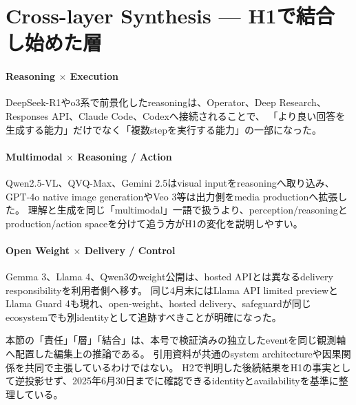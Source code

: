\Needspace{0.36\textheight}
\section{Cross-layer Synthesis — H1で結合し始めた層}
\label{analysis:h1-cross-layer}

\paragraph{Reasoning $\times$ Execution}
DeepSeek-R1やo3系で前景化したreasoningは、Operator、Deep Research、Responses API、Claude Code、Codexへ接続されることで、
「より良い回答を生成する能力」だけでなく「複数stepを実行する能力」の一部になった。
\cite{src-8f8555b73e1b,src-bf92f3d905c3,src-95b210494c88,src-8fec3ef3a97d,src-78593f4b387f,src-e7aef8f1b13b}

\paragraph{Multimodal $\times$ Reasoning / Action}
Qwen2.5-VL、QVQ-Max、Gemini 2.5はvisual inputをreasoningへ取り込み、GPT-4o native image generationやVeo 3等は出力側をmedia productionへ拡張した。
理解と生成を同じ「multimodal」一語で扱うより、perception/reasoningとproduction/action spaceを分けて追う方がH1の変化を説明しやすい。
\cite{src-dc21f366b638,src-8cb736b33646,src-421ee9af3f80,src-877e7da88408,src-e68f8ce96685}

\paragraph{Open Weight $\times$ Delivery / Control}
Gemma 3、Llama 4、Qwen3のweight公開は、hosted APIとは異なるdelivery responsibilityを利用者側へ移す。
同じ4月末にはLlama API limited previewとLlama Guard 4も現れ、open-weight、hosted delivery、safeguardが同じecosystemでも別identityとして追跡すべきことが明確になった。
\cite{src-1bb16d7254b1,src-05f285e9757b,src-3e4a3f3b3d83,src-fca961b24baf,src-383476bdf62e}

\begin{claimboundary}[横断分析の境界]
本節の「責任」「層」「結合」は、本号で検証済みの独立したeventを同じ観測軸へ配置した編集上の推論である。
引用資料が共通のsystem architectureや因果関係を共同で主張しているわけではない。
H2で判明した後続結果をH1の事実として逆投影せず、2025年6月30日までに確認できるidentityとavailabilityを基準に整理している。
\end{claimboundary}
